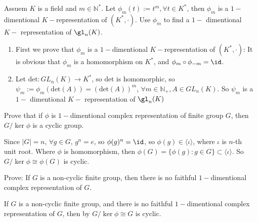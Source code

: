 \documentclass{ctexart}
\begin{document}
\begin{problem}
Assuem $K$ is a field and $m\in \mathbb{N}^*$. Let $\phi_m(t):=t^m,\forall t\in K^*$, then $\phi_m$ is a $1-$dimentional $K-$representation of $(K^*,\cdot)$. Use $\phi_m$ to find a $1-$ dimentional $K-$ representation of $\gl_n(K)$.
\end{problem}
\begin{solution}
    \begin{enumerate}
        \item First we prove that $\phi_m$ is a $1-$dimentional $K-$representation of $(K^*,\cdot)$: It is obvious that $\phi_m$ is a homomorphism on $K^*$, and $\phi_m\circ \phi_{-m}=\id$.
        \item Let $\mathrm{det}:GL_n(K)\to K^*$, so $\mathrm{det}$ is homomorphic, so $\psi_m:=\phi_m(\mathrm{det}(A))=(\mathrm{det}(A))^m$, $\forall m\in \mathbb{N}_+, A\in GL_n(K)$. So $\psi_m$ is a $1-$ dimentional $K-$ representation of $\gl_n(K)$
    \end{enumerate}
\end{solution}


\begin{problem}\label{pro:4}
Prove that if $\phi$ is $1-$dimentional complex representation of finite group $G$, then $G/\ker\phi$ is a cyclic group.
\end{problem}
\begin{solution}
    Since $|G|=n$, $\forall g\in G$, $g^n=e$, so $\phi(g)^n=\id$, so $\phi(g)\in\langle \iota \rangle$, where $\iota$ is $n$-th unit root. Where $\phi$ is homomorphism, then $\phi(G)=\{\phi(g):g\in G\}\subset \langle \iota \rangle$. So $G/\ker\phi\cong\phi(G)$ is cyclic.
\end{solution}


\begin{problem}
Prove: If $G$ is a non-cyclic finite group, then there is no faithful $1-$dimentional complex representation of $G$.
\end{problem}
\begin{solution}
    If $G$ is a non-cyclic finite group, and there is no faithful $1-$dimentional complex representation of $G$, then by  $G/\ker\phi\cong G$ is cyclic.
\end{solution}
\end{document}
